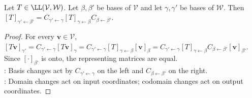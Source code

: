 \begin{theorem} \label{thm:two-sided-change-of-basis-for-linear-maps} \\
Let $T\in\LL(\mathcal{V},\mathcal{W})$. Let $\beta,\beta'$ be bases of $\mathcal{V}$ and let $\gamma,\gamma'$ be bases of $\mathcal{W}$. Then $[T]_{\gamma'\leftarrow\beta'} =C_{\gamma'\leftarrow\gamma}[T]_{\gamma\leftarrow\beta}C_{\beta\leftarrow\beta'}$.
\begin{proof}
For every $\mathbf{v}\in\mathcal{V}$, $[T\mathbf{v}]_{\gamma'} =C_{\gamma'\leftarrow\gamma}[T\mathbf{v}]_{\gamma} =C_{\gamma'\leftarrow\gamma}[T]_{\gamma\leftarrow\beta}[\mathbf{v}]_{\beta} =C_{\gamma'\leftarrow\gamma}[T]_{\gamma\leftarrow\beta}C_{\beta\leftarrow\beta'}[\mathbf{v}]_{\beta'}$.\\
Since $[\cdot]_{\beta'}$ is onto, the representing matrices are equal.\\
: Basis changes act by $C_{\gamma'\leftarrow\gamma}$ on the left and $C_{\beta\leftarrow\beta'}$ on the right.\\
: Domain changes act on input coordinates; codomain changes act on output coordinates.
\end{proof}
\end{theorem}

